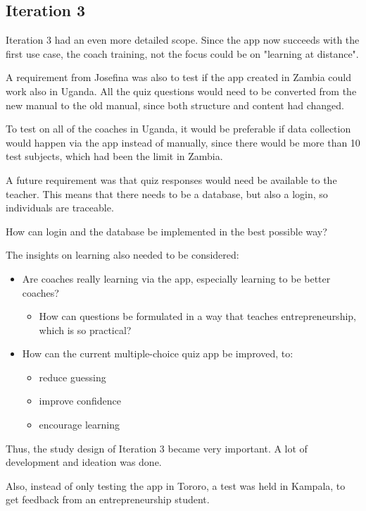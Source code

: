 \subsection{Iteration 3}

Iteration 3 had an even more detailed scope. Since the app now succeeds with the first use case, the coach training, not the focus could be on "learning at distance".

A requirement from Josefina was also to test if the app created in Zambia could work also in Uganda. All the quiz questions would need to be converted from the new manual to the old manual, since both structure and content had changed.

To test on all of the coaches in Uganda, it would be preferable if data collection would happen via the app instead of manually, since there would be more than 10 test subjects, which had been the limit in Zambia.

A future requirement was that quiz responses would need be available to the teacher. This means that there needs to be a database, but also a login, so individuals are traceable.

How can login and the database be implemented in the best possible way?

The insights on learning also needed to be considered:
\begin{itemize}
  \item Are coaches really learning via the app, especially learning to be better coaches?
  \begin{itemize}
    \item How can questions be formulated in a way that teaches entrepreneurship, which is so practical?
  \end{itemize}
  \item How can the current multiple-choice quiz app be improved, to:
  \begin{itemize}
  \item reduce guessing
  \item improve confidence
  \item encourage learning
  \end{itemize}
\end{itemize}

Thus, the study design of Iteration 3 became very important. A lot of development and ideation was done.

Also, instead of only testing the app in Tororo, a test was held in Kampala, to get feedback from an entrepreneurship student.

